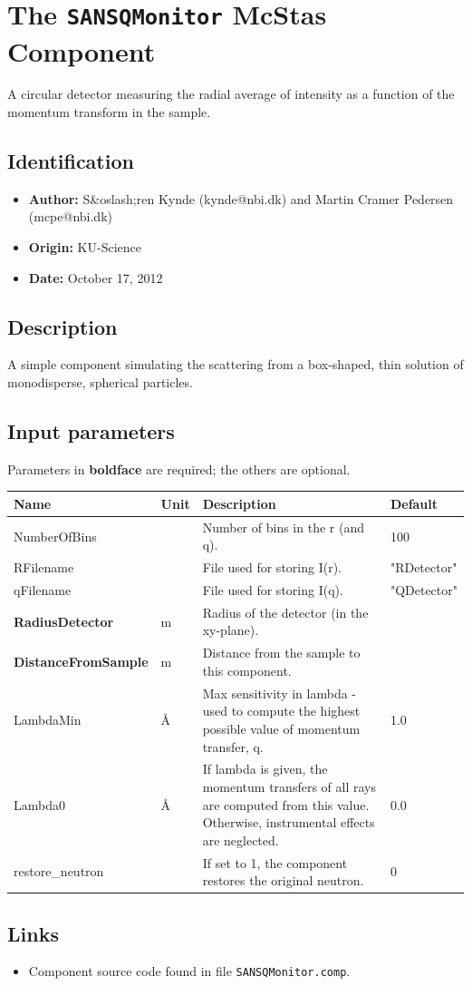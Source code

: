 \section{The \texttt{SANSQMonitor} McStas Component}
A circular detector measuring the radial average of intensity as a function
of the momentum transform in the sample.

\subsection*{Identification}
\begin{itemize}
  \item \textbf{Author:} S\&oslash;ren Kynde (kynde@nbi.dk) and Martin Cramer Pedersen (mcpe@nbi.dk)
  \item \textbf{Origin:} KU-Science
  \item \textbf{Date:} October 17, 2012
\end{itemize}

\subsection*{Description}
A simple component simulating the scattering from a box-shaped, thin solution of monodisperse, spherical particles.

\subsection*{Input parameters}
Parameters in \textbf{boldface} are required; the others are optional.

\begin{longtable}{p{}p{}p{}p{}}
\toprule
\textbf{Name} & \textbf{Unit} & \textbf{Description} & \textbf{Default} \\
\midrule
\endhead
NumberOfBins &  & Number of bins in the r (and q). & 100 \\
RFilename &  & File used for storing I(r). & "RDetector" \\
qFilename &  & File used for storing I(q). & "QDetector" \\
\textbf{RadiusDetector} & m & Radius of the detector (in the xy-plane). &  \\
\textbf{DistanceFromSample} & m & Distance from the sample to this component. &  \\
LambdaMin & \AA{} & Max sensitivity in lambda - used to compute the highest possible value of momentum transfer, q. & 1.0 \\
Lambda0 & \AA{} & If lambda is given, the momentum transfers of all rays are computed from this value. Otherwise, instrumental effects are neglected. & 0.0 \\
restore\_neutron &  & If set to 1, the component restores the original neutron. & 0 \\
\bottomrule
\end{longtable}

\subsection*{Links}
\begin{itemize}
  \item Component source code found in file \texttt{SANSQMonitor.comp}.
\end{itemize}
